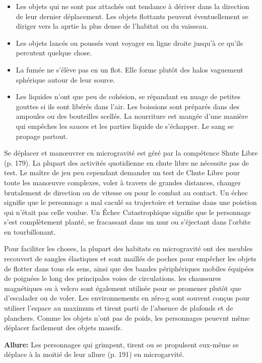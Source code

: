 \begin{itemize} \item Les objets qui ne sont pas attachés ont tendance à dériver dans la direction de leur dernier déplacement. Les objets flottants peuvent éventuellement se diriger vers la aprtie la plus dense de l'habitat ou du vaisseau. \item Les objets lancés ou poussés vont voyager en ligne droite jusqu'à ce qu'ils percutent quelque chose. \item La fumée ne s'élève pas en un flot. Elle forme plutôt des halos vaguement sphérique autour de leur source. \item Les liquides n'ont que peu de cohésion, se répandant en nuage de petites gouttes si ils sont libérés dans l'air. Les boissions sont préparés dans des ampoules ou des bouteilles scellés. La nourriture est mangée d'une manière qui empêches les sauces et les parties liquide de s'échapper. Le sang se propage partout. \end{itemize} 

Se déplacer et manœuvrer en microgravité est géré par la compétence Shute Libre (p. 179). La plupart des activités quotidienne en chute libre ne nécessite pas de test. Le maître de jeu peu cependant demander un test de Chute Libre pour toute les manœuvre complexes, voler à travers de grandes distances, changer brutalement de direction ou de vitesse ou pour le combat au contact. Un échec signifie que le personnage a mal caculé sa trajectoire et termine dans une poistion qui n'était pas celle voulue. Un Échec Catastrophique signifie que le personnage s'est complètement planté, se fracassant dans un mur ou s'éjectant dans l'orbite en tourbillonant. 

Pour faciliter les choses, la plupart des habitats en microgravité ont des meubles recouvert de sangles élastiques et sont maillés de poches pour empêcher les objets de flotter dans tous els sens, ainsi que des bandes périphériques mobiles équipées de poignées le long des principales voies de circulations. les chaussures magnétiques ou à velcro sont également utilisée pour se promener plutôt que d'escalader ou de voler. Les environnements en zéro-g sont souvent conçus pour utiliser l'espace au maximum et tirent parti de l'absence de plafonds et de planchers. Comme les objets n'ont pas de poids, les personnages peuevnt même déplacer facilement des objets massifs. 

\textbf{Allure:} Les personnages qui grimpent, tirent ou se propulsent eux-même se déplace à la moitié de leur allure (p. 191) en microgarvité. 

